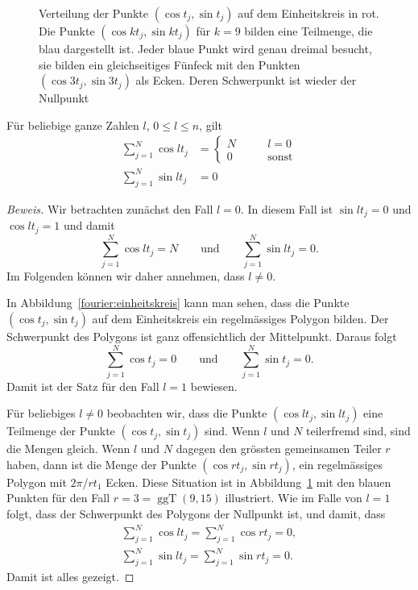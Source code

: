 \begin{figure}
\begin{tikzpicture}[>=latex,thick]
\end{tikzpicture}
\caption{Verteilung der Punkte $(\cos t_j, \sin t_j)$  auf dem Einheitskreis 
in rot.
Die Punkte $(\cos kt_j,\sin kt_j)$ für $k=9$ bilden eine Teilmenge, die
blau dargestellt ist.
Jeder blaue Punkt wird genau dreimal besucht, sie bilden ein gleichseitiges
Fünfeck mit den Punkten $(\cos 3t_j,\sin 3t_j)$ als Ecken.
Deren Schwerpunkt ist wieder der Nullpunkt
\label{fourier:einheitskreis}
}
\end{figure}

\begin{satz}
Für beliebige ganze Zahlen $l$, $0\le l\le n$, gilt
\begin{equation*}
\begin{aligned}
\sum_{j=1}^N \cos lt_j
&=
\begin{cases}
N&\qquad l=0\\
0&\qquad\text{sonst}
\end{cases}
\\
\sum_{j=1}^N \sin lt_j
&=0
\end{aligned}
\end{equation*}
\end{satz}

\begin{proof}[Beweis]
Wir betrachten zunächst den Fall $l=0$.
In diesem Fall ist $\sin lt_j=0$ und $\cos lt_j=1$ und damit
\[
\sum_{j=1}^N \cos lt_j = N
\qquad\text{und}\qquad
\sum_{j=1}^N \sin lt_j = 0.
\]
Im Folgenden können wir daher annehmen, dass $l\ne 0$.

In Abbildung~\eqref{fourier:einheitskreis} kann man sehen, dass die Punkte
$(\cos t_j,\sin t_j)$ auf dem Einheitskreis ein regelmässiges Polygon
bilden.
Der Schwerpunkt des Polygons ist ganz offensichtlich der Mittelpunkt.
Daraus folgt
\[
\sum_{j=1}^N \cos t_j = 0
\qquad\text{und}\qquad
\sum_{j=1}^N \sin t_j = 0.
\]
Damit ist der Satz für den Fall $l=1$ bewiesen.

Für beliebiges $l\ne 0$ beobachten wir, dass die Punkte 
$(\cos lt_j,\sin lt_j)$ eine Teilmenge der Punkte $(\cos t_j, \sin t_j)$
sind.
Wenn $l$ und $N$ teilerfremd sind, sind die Mengen gleich.
Wenn $l$ und $N$ dagegen den grössten gemeinsamen Teiler $r$ haben, dann
ist die Menge der Punkte $(\cos rt_j,\sin rt_j)$, ein regelmässiges
Polygon mit $2\pi / rt_1$ Ecken.
Diese Situation ist in Abbildung~\ref{fourier:einheitskreis} mit den
blauen Punkten für den Fall $r=3=\operatorname{ggT}(9,15)$
illustriert.
Wie im Falle von $l=1$ folgt, dass der Schwerpunkt des Polygons der
Nullpunkt ist, und damit, dass
\begin{align*}
\sum_{j=1}^N \cos lt_j 
=
\sum_{j=1}^N \cos rt_j 
=
0,
\\
\sum_{j=1}^N \sin lt_j 
=
\sum_{j=1}^N \sin rt_j 
=
0.
\end{align*}
Damit ist alles gezeigt.
\end{proof}

